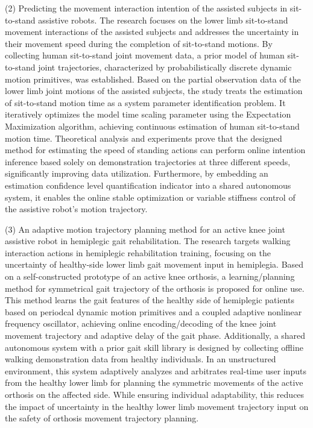 \begin{abstract*}
(2) Predicting the movement interaction intention of the assisted subjects in sit-to-stand assistive robots. The research focuses on the lower limb sit-to-stand movement interactions of the assisted subjects and addresses the uncertainty in their movement speed during the completion of sit-to-stand motions. By collecting human sit-to-stand joint movement data, a prior model of human sit-to-stand joint trajectories, characterized by probabilistically discrete dynamic motion primitives, was established. Based on the partial observation data of the lower limb joint motions of the assisted subjects, the study treats the estimation of sit-to-stand motion time as a system parameter identification problem. It iteratively optimizes the model time scaling parameter using the Expectation Maximization algorithm, achieving continuous estimation of human sit-to-stand motion time. Theoretical analysis and experiments prove that the designed method for estimating the speed of standing actions can perform online intention inference based solely on demonstration trajectories at three different speeds, significantly improving data utilization. Furthermore, by embedding an estimation confidence level quantification indicator into a shared autonomous system, it enables the online stable optimization or variable stiffness control of the assistive robot's motion trajectory.

(3) An adaptive motion trajectory planning method for an active knee joint assistive robot in hemiplegic gait rehabilitation. The research targets walking interaction actions in hemiplegic rehabilitation training, focusing on the uncertainty of healthy-side lower limb gait movement input in hemiplegia. Based on a self-constructed prototype of an active knee orthosis, a learning/planning method for symmetrical gait trajectory of the orthosis is proposed for online use. This method learns the gait features of the healthy side of hemiplegic patients based on periodcal dynamic motion primitives and a coupled adaptive nonlinear frequency oscillator, achieving online encoding/decoding of the knee joint movement trajectory and adaptive delay of the gait phase. Additionally, a shared autonomous system with a prior gait skill library is designed by collecting offline walking demonstration data from healthy individuals. In an unstructured environment, this system adaptively analyzes and arbitrates real-time user inputs from the healthy lower limb for planning the symmetric movements of the active orthosis on the affected side. While ensuring individual adaptability, this reduces the impact of uncertainty in the healthy lower limb movement trajectory input on the safety of orthosis movement trajectory planning.
\end{abstract*}

